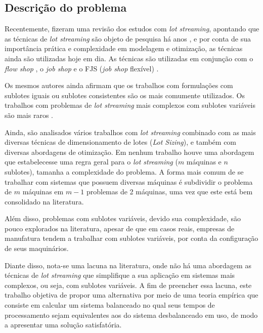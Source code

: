 \subsection{Descrição do problema}
Recentemente,  fizeram uma revisão dos estudos com \textit{lot streaming}, apontando que as técnicas de \textit{lot streaming} são objeto de pesquisa há anos \cite{Potts1989, R.Baker1990475, Baker1993}, e por conta de sua importância prática e complexidade em modelagem e otimização, as técnicas ainda são utilizadas hoje em dia. As técnicas são utilizadas em conjunção com o \textit{flow shop} \cite{Potts1989, Liu2003, Biskup2006, Tseng2008, SancarEdis2009, Defersha2010, Defersha2012, Ventura2013, Mortezaei2014}, o \textit{job shop} \cite{Low2004773, Chan2008321, Petrovic2008275,SancarEdis2009442, Lei20134930} e o FJS (\textit{job shop} flexível) \cite{Bai2009, Defersha20122331, Calleja201493, Demir20143905, Rohaninejad2015, Bozek201621}. 

Os mesmos autores ainda afirmam que os trabalhos com formulações com sublotes iguais \cite{Potts1989, Chan2004472, Chan2008321, Low2004773, Tseng2008, SancarEdis2009442, Pan2012166, Ventura2013, Calleja201493} ou sublotes consistentes \cite{Potts1989, Low2004773, Chan2008321, SancarEdis2009, Bai2009, Defersha2012, Lei20134930, Demir20143905} são os mais comumente utilizados. Os trabalhos com problemas de \textit{lot streaming} mais complexos com sublotes variáveis são mais raros \cite{Liu2003, Biskup2006, Petrovic2008275, Defersha2010, Mortezaei2014}. 

Ainda, são analisados vários trabalhos com \textit{lot streaming} combinado com as mais diversas técnicas de dimensionamento de lotes (\textit{Lot Sizing}), e também com diversas abordagens de otimização. Em nenhum trabalho houve uma abordagem que estabelecesse uma regra geral para o \textit{lot streaming} ($m$ máquinas e $n$ sublotes), tamanha a complexidade do problema. A forma mais comum de se trabalhar com sistemas que possuem diversas máquinas é subdividir o problema de $m$ máquinas em $m-1$ problemas de 2 máquinas, uma vez que este está bem consolidado na literatura.

Além disso, problemas com sublotes variáveis, devido sua complexidade, são pouco explorados na literatura, apesar de que em casos reais, empresas de manufatura tendem a trabalhar com sublotes variáveis, por conta da configuração de seus maquinários. 

Diante disso, nota-se uma lacuna na literatura, onde não há uma abordagem as técnicas de \textit{lot streaming} que simplifique a sua aplicação em sistemas mais complexos, ou seja, com sublotes variáveis. A fim de preencher essa lacuna, este trabalho objetiva de propor uma alternativa por meio de uma teoria empírica que consiste em calcular um sistema balanceado no qual seus tempos de processamento sejam equivalentes aos do sistema desbalanceado em uso, de modo a apresentar uma solução satisfatória.

